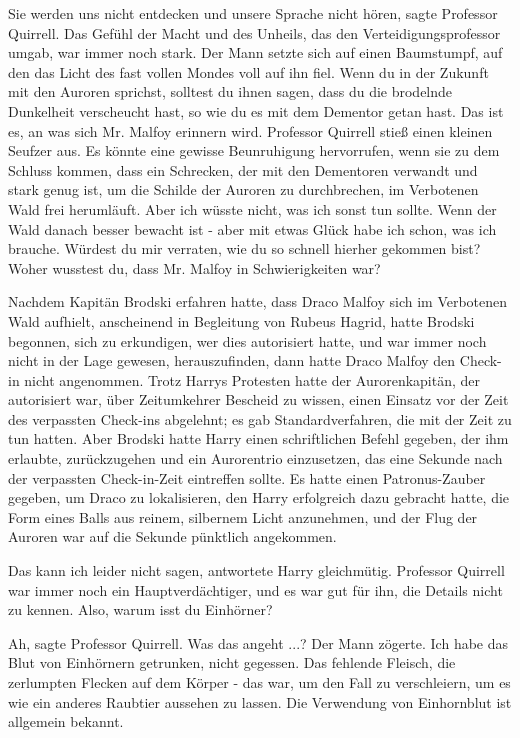 \glqq{}Sie werden uns nicht entdecken und unsere Sprache nicht hören\grqq{},
sagte Professor Quirrell. Das Gefühl der Macht und des Unheils, das den
Verteidigungsprofessor umgab, war immer noch stark. Der Mann setzte sich
auf einen Baumstumpf, auf den das Licht des fast vollen Mondes voll auf
ihn fiel. \glqq{}Wenn du in der Zukunft mit den Auroren sprichst, solltest
du ihnen sagen, dass du die brodelnde Dunkelheit verscheucht hast, so wie
du es mit dem Dementor getan hast. Das ist es, an was sich Mr. Malfoy
erinnern wird.\grqq{} Professor Quirrell stieß einen kleinen Seufzer aus.
\glqq{}Es könnte eine gewisse Beunruhigung hervorrufen, wenn sie zu dem
Schluss kommen, dass ein Schrecken, der mit den Dementoren verwandt und
stark genug ist, um die Schilde der Auroren zu durchbrechen, im
Verbotenen Wald frei herumläuft. Aber ich wüsste nicht, was ich sonst tun
sollte. Wenn der Wald danach besser bewacht ist - aber mit etwas Glück
habe ich schon, was ich brauche. Würdest du mir verraten, wie du so
schnell hierher gekommen bist? Woher wusstest du, dass Mr. Malfoy in
Schwierigkeiten war?\grqq{}

Nachdem Kapitän Brodski erfahren hatte, dass Draco Malfoy sich im Verbotenen
Wald aufhielt, anscheinend in Begleitung von Rubeus Hagrid, hatte Brodski
begonnen, sich zu erkundigen, wer dies autorisiert hatte, und war immer
noch nicht in der Lage gewesen, herauszufinden, dann hatte Draco Malfoy
den Check-in nicht angenommen. Trotz Harrys Protesten hatte der
Aurorenkapitän, der autorisiert war, über Zeitumkehrer Bescheid zu
wissen, einen Einsatz vor der Zeit des verpassten Check-ins abgelehnt; es
gab Standardverfahren, die mit der Zeit zu tun hatten. Aber Brodski hatte
Harry einen schriftlichen Befehl gegeben, der ihm erlaubte, zurückzugehen
und ein Aurorentrio einzusetzen, das eine Sekunde nach der verpassten
Check-in-Zeit eintreffen sollte. Es hatte einen Patronus-Zauber gegeben,
um Draco zu lokalisieren, den Harry erfolgreich dazu gebracht hatte, die
Form eines Balls aus reinem, silbernem Licht anzunehmen, und der Flug der
Auroren war auf die Sekunde pünktlich angekommen.

\glqq{}Das kann ich leider nicht sagen\grqq{}, antwortete Harry gleichmütig.
Professor Quirrell war immer noch ein Hauptverdächtiger, und es war gut
für ihn, die Details nicht zu kennen. \glqq{}Also, warum isst du
Einhörner?\grqq{}

\glqq{}Ah\grqq{}, sagte Professor Quirrell. \glqq{}Was das angeht ...?\grqq{} Der
Mann zögerte. \glqq{}Ich habe das Blut von Einhörnern getrunken, nicht
gegessen. Das fehlende Fleisch, die zerlumpten Flecken auf dem Körper -
das war, um den Fall zu verschleiern, um es wie ein anderes Raubtier
aussehen zu lassen. Die Verwendung von Einhornblut ist allgemein
bekannt.\grqq{}

